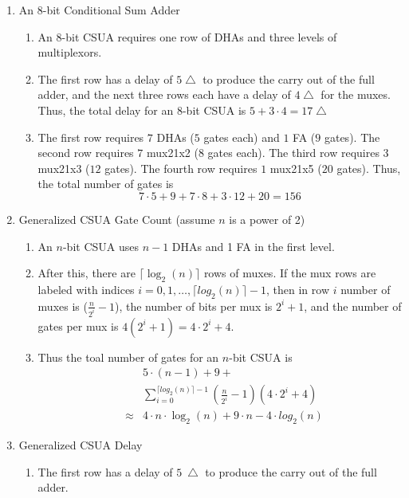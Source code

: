 \documentclass[times, twocolumn, 10pt]{article}
\begin{document}
\begin{enumerate}
\begin{table} [h]
  \end{table}
\item An $8$-bit Conditional Sum Adder 
  \begin{enumerate}
  \item An $8$-bit CSUA requires one row of DHAs and three levels of multiplexors. 
  \item The first row has a delay of $5 \bigtriangleup$ to produce the 
    carry out of the full adder, and the next three rows each have 
    a delay of $4 \bigtriangleup$ for the muxes. Thus, the total
    delay for an $8$-bit CSUA is $5 + 3 \cdot 4 = 17 \bigtriangleup$ 
  \item The first row requires $7$ DHAs ($5$ gates each) and $1$ FA
    ($9$ gates). 
    The second row requires $7$ mux21x2 ($8$ gates each). 
    The third row requires $3$ mux21x3 ($12$ gates). 
    The fourth row requires $1$ mux21x5 ($20$ gates). 
    Thus, the total number of gates is 
    \[ 	7 \cdot 5 + 9 + 7 \cdot 8 + 3 \cdot 12 + 20 = 156 \]
  \end{enumerate}
\item Generalized  CSUA Gate Count (assume $n$ is a power of 2)
  \begin{enumerate}
  \item An $n$-bit CSUA uses $n - 1$ DHAs and 1 FA in the first level. 
  \item After this, there are $\lceil \log_{2}(n) \rceil$ rows of muxes. 
    If the mux rows are labeled with indices 
    $i = 0, 1, \ldots,  \lceil log_{2}(n) \rceil - 1$,
    then in row $i$ number of muxes is ($\frac{n}{2^{i}} - 1$), the number of
    bits per mux is $2^{i} + 1$, and the number of gates per mux is 
    $4(2^{i} + 1) = 4 \cdot 2^{i} + 4$.
  \item Thus the toal number of gates for an $n$-bit CSUA is 
    \begin{eqnarray*}
      & & 5 \cdot (n - 1) + 9 +\\
      &  & \sum_{i=0}^{\lceil log_{2}(n) \rceil -1}
      (\frac{n}{2^{i}} - 1) (4 \cdot 2^{i} + 4) \\
      & \approx & 4 \cdot n \cdot \log_{2}(n) + 9 \cdot n - 4 \cdot
      log_{2}(n) 
    \end{eqnarray*}
  \end{enumerate}
\item Generalized CSUA Delay
  \begin{enumerate}
  \item The first row has a delay of $5~\bigtriangleup$ to produce the 
    carry out of the full adder. 

\end{enumerate}
\end{enumerate}
\end{document}
